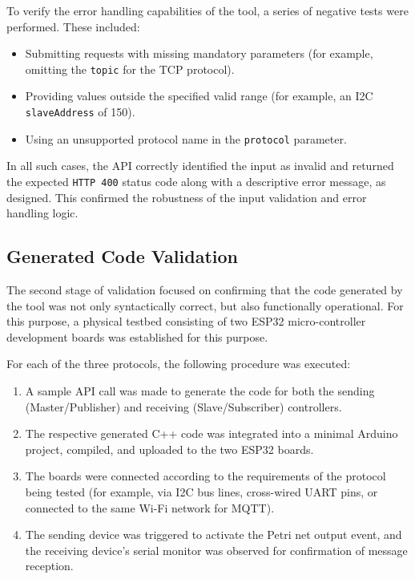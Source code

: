 To verify the error handling capabilities of the tool, a series of negative tests were performed. These included:
\begin{itemize}
    \item Submitting requests with missing mandatory parameters (for example, omitting the \texttt{topic} for the TCP protocol).
    \item Providing values outside the specified valid range (for example, an I2C \texttt{slaveAddress} of 150).
    \item Using an unsupported protocol name in the \texttt{protocol} parameter.
\end{itemize}
In all such cases, the API correctly identified the input as invalid and returned the expected \texttt{HTTP 400} status code along with a descriptive error message, as designed. This confirmed the robustness of the input validation and error handling logic.

\subsection{Generated Code Validation}
\label{subsec:code_validation}

The second stage of validation focused on confirming that the code generated by the tool was not only syntactically correct, but also functionally operational. For this purpose, a physical testbed consisting of two ESP32 micro-controller development boards was established for this purpose.

For each of the three protocols, the following procedure was executed:
\begin{enumerate}
    \item A sample API call was made to generate the code for both the sending (Master/Publisher) and receiving (Slave/Subscriber) controllers.
    \item The respective generated C++ code was integrated into a minimal Arduino project, compiled, and uploaded to the two ESP32 boards.
    \item The boards were connected according to the requirements of the protocol being tested (for example, via I2C bus lines, cross-wired UART pins, or connected to the same Wi-Fi network for MQTT).
    \item The sending device was triggered to activate the Petri net output event, and the receiving device's serial monitor was observed for confirmation of message reception.
\end{enumerate}

